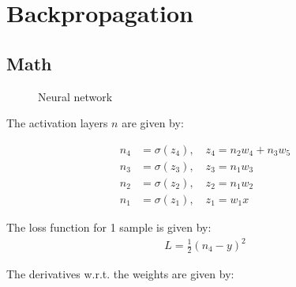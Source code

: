 \documentclass[a4paper,12pt]{article}
\begin{document}

\tableofcontents %
\newpage

\section{Backpropagation}
\subsection{Math}
\begin{figure}[H]
\hfill
{}
\hfill
\caption{Neural network}
\label{Neural network}
\end{figure}

The activation layers $n$ are given by:

\begin{equation}
\begin{aligned}
n_4 &=\sigma(z_4), \quad z_4 = n_2w_4+n_3w_5   \\
n_3 &= \sigma(z_3),\quad z_3 = n_1w_3 		\\
n_2 &= \sigma(z_2),\quad z_2 = n_1w_2      \\
n_1 &= \sigma(z_1),\quad z_1 = w_1 x
\end{aligned}
\end{equation}

The loss function for 1 sample is given by:
\begin{equation}
\begin{aligned}
L=\frac{1}{2}(n_4-y)^2
\end{aligned}
\end{equation}


The derivatives w.r.t. the weights are given by:
\end{document}
